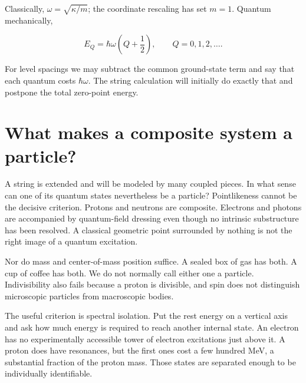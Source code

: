 Classically, \(\omega=\sqrt{\kappa/m}\); the coordinate rescaling has set
\(m=1\). Quantum mechanically,

\begin{equation}
  E_Q=\hbar\omega\left(Q+\frac12\right),
  \qquad Q=0,1,2,\ldots .
  \label{eq:l02-oscillator-spectrum}
\end{equation}

For level spacings we may subtract the common ground-state term and say that
each quantum costs \(\hbar\omega\). The string calculation will initially do
exactly that and postpone the total zero-point energy.

\begin{classroomqa}
\end{classroomqa}

\section{What makes a composite system a particle?}

A string is extended and will be modeled by many coupled pieces. In what
sense can one of its quantum states nevertheless be a particle? Pointlikeness
cannot be the decisive criterion. Protons and neutrons are composite.
Electrons and photons are accompanied by quantum-field dressing even though
no intrinsic substructure has been resolved. A classical geometric point
surrounded by nothing is not the right image of a quantum excitation.

Nor do mass and center-of-mass position suffice. A sealed box of gas has
both. A cup of coffee has both. We do not normally call either one a
particle. Indivisibility also fails because a proton is divisible, and spin
does not distinguish microscopic particles from macroscopic bodies.

The useful criterion is spectral isolation. Put the rest energy on a vertical
axis and ask how much energy is required to reach another internal state. An
electron has no experimentally accessible tower of electron excitations just
above it. A proton does have resonances, but the first ones cost a few hundred
MeV, a substantial fraction of the proton mass. Those states are separated
enough to be individually identifiable.

